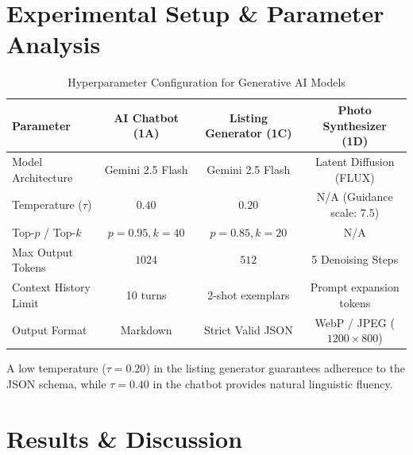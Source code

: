\documentclass[12pt,a4paper]{article}
\begin{document}
\section{Experimental Setup \& Parameter Analysis}

\begin{table}[H]
\centering
\caption{Hyperparameter Configuration for Generative AI Models}
\label{tab:genai_params}
\begin{tabular}{lccc}
\toprule
\textbf{Parameter} & \textbf{AI Chatbot (1A)} & \textbf{Listing Generator (1C)} & \textbf{Photo Synthesizer (1D)} \\
\midrule
Model Architecture & Gemini 2.5 Flash & Gemini 2.5 Flash & Latent Diffusion (FLUX) \\
Temperature ($\tau$) & $0.40$ & $0.20$ & N/A (Guidance scale: $7.5$) \\
Top-$p$ / Top-$k$ & $p = 0.95, k = 40$ & $p = 0.85, k = 20$ & N/A \\
Max Output Tokens & $1024$ & $512$ & 5 Denoising Steps \\
Context History Limit & 10 turns & 2-shot exemplars & Prompt expansion tokens \\
Output Format & Markdown & Strict Valid JSON & WebP / JPEG ($1200\times 800$) \\
\bottomrule
\end{tabular}
\end{table}

A low temperature ($\tau = 0.20$) in the listing generator guarantees adherence to the JSON schema, while $\tau = 0.40$ in the chatbot provides natural linguistic fluency.

\section{Results \& Discussion}
\end{document}
